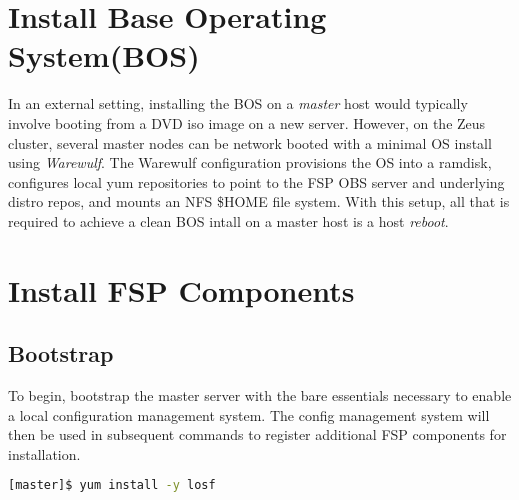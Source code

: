 \documentclass[letterpaper]{article}
\begin{document}

\section{Install Base Operating System(BOS)}

In an external setting, installing the BOS on a {\em master} host would
typically involve booting from a DVD iso image on a new server.  However, on
the Zeus cluster, several master nodes can be network booted with a minimal OS
install using {\em Warewulf}. The Warewulf configuration provisions the OS into
a ramdisk, configures local yum repositories to point to the FSP OBS server and
underlying distro repos, and mounts an NFS \$HOME file system. With this setup,
all that is required to achieve a clean BOS intall on a master host is a host
{\em reboot}. 

\section{Install FSP Components}

\subsection{Bootstrap}

To begin, bootstrap the master server with the bare essentials necessary to
enable a local configuration management system. The config management system
will then be used in subsequent commands to register additional FSP components
for installation.

\vspace*{0.2cm}

\begin{lstlisting}[language=bash,caption={Commands run on {\bf master node}.}]
[master]$ yum install -y losf
\end{lstlisting}
\end{document}
